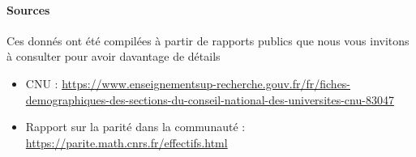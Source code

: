 \paragraph*{Sources} Ces donn\'es ont \'et\'e compil\'ees \`a partir de rapports publics que nous vous invitons \`a consulter pour avoir davantage de d\'etails
\begin{itemize}
\item CNU : 
\url{https://www.enseignementsup-recherche.gouv.fr/fr/fiches-demographiques-des-sections-du-conseil-national-des-universites-cnu-83047}
\item Rapport sur la parit\'e dans la communaut\'e : \url{https://parite.math.cnrs.fr/effectifs.html}
\end{itemize}


